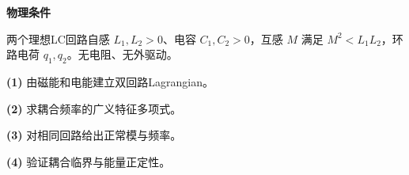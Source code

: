 \textbf{物理条件}\par 两个理想LC回路自感 \(L_1,L_2>0\)、电容 \(C_1,C_2>0\)，互感 \(M\) 满足 \(M^2<L_1L_2\)，环路电荷 \(q_1,q_2\)。无电阻、无外驱动。
\par\noindent\textbf{(1)} 由磁能和电能建立双回路Lagrangian。
\par\noindent\textbf{(2)} 求耦合频率的广义特征多项式。
\par\noindent\textbf{(3)} 对相同回路给出正常模与频率。
\par\noindent\textbf{(4)} 验证耦合临界与能量正定性。
